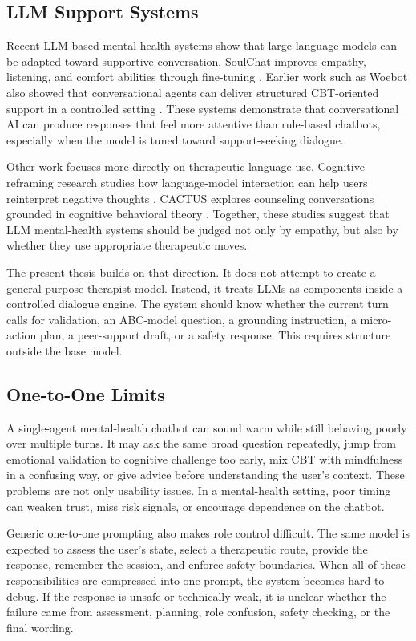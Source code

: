 \subsection{LLM Support Systems}

Recent LLM-based mental-health systems show that large language models can be adapted toward supportive conversation. SoulChat improves empathy, listening, and comfort abilities through fine-tuning \citep{Chen2023SoulChat}. Earlier work such as Woebot also showed that conversational agents can deliver structured CBT-oriented support in a controlled setting \citep{Fitzpatrick2017Woebot}. These systems demonstrate that conversational AI can produce responses that feel more attentive than rule-based chatbots, especially when the model is tuned toward support-seeking dialogue.

Other work focuses more directly on therapeutic language use. Cognitive reframing research studies how language-model interaction can help users reinterpret negative thoughts \citep{Sharma2023CognitiveReframing}. CACTUS explores counseling conversations grounded in cognitive behavioral theory \citep{Lee2024Cactus}. Together, these studies suggest that LLM mental-health systems should be judged not only by empathy, but also by whether they use appropriate therapeutic moves.

The present thesis builds on that direction. It does not attempt to create a general-purpose therapist model. Instead, it treats LLMs as components inside a controlled dialogue engine. The system should know whether the current turn calls for validation, an ABC-model question, a grounding instruction, a micro-action plan, a peer-support draft, or a safety response. This requires structure outside the base model.

\subsection{One-to-One Limits}

A single-agent mental-health chatbot can sound warm while still behaving poorly over multiple turns. It may ask the same broad question repeatedly, jump from emotional validation to cognitive challenge too early, mix CBT with mindfulness in a confusing way, or give advice before understanding the user's context. These problems are not only usability issues. In a mental-health setting, poor timing can weaken trust, miss risk signals, or encourage dependence on the chatbot.

Generic one-to-one prompting also makes role control difficult. The same model is expected to assess the user's state, select a therapeutic route, provide the response, remember the session, and enforce safety boundaries. When all of these responsibilities are compressed into one prompt, the system becomes hard to debug. If the response is unsafe or technically weak, it is unclear whether the failure came from assessment, planning, role confusion, safety checking, or the final wording.

